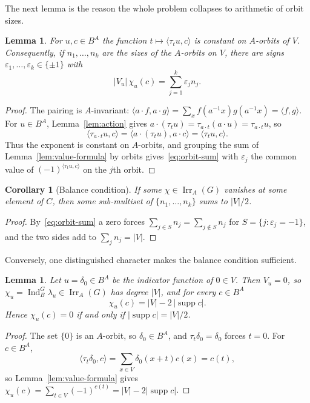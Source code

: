 \documentclass[11pt,a4paper,reqno]{amsart}
\newtheorem{lemma}[theorem]{Lemma}
\newtheorem{corollary}[theorem]{Corollary}
\theoremstyle{definition}
\theoremstyle{remark}
\newcommand{\Irr}{\operatorname{Irr}}
\newcommand{\Ind}{\operatorname{Ind}}
\newcommand{\supp}{\operatorname{supp}}
\begin{document}
The next lemma is the reason the whole problem collapses to arithmetic
of orbit sizes.

\begin{lemma}\label{lem:orbit-constant}
For $u,c\in B^A$ the function $t\mapsto\langle\tau_tu,c\rangle$ is
constant on $A$-orbits of $V$.  Consequently, if $n_1,\dots,n_k$ are
the sizes of the $A$-orbits on $V$, there are signs
$\varepsilon_1,\dots,\varepsilon_k\in\{\pm1\}$ with
\begin{equation}\label{eq:orbit-sum}
 |V_u|\,\chi_u(c)=\sum_{j=1}^k\varepsilon_jn_j .
\end{equation}
\end{lemma}

\begin{proof}
The pairing is $A$-invariant: $\langle a\cdot f,a\cdot g\rangle
=\sum_xf(a^{-1}x)g(a^{-1}x)=\langle f,g\rangle$.  For $u\in B^A$,
Lemma~\ref{lem:action} gives
$a\cdot(\tau_tu)=\tau_{a\cdot t}(a\cdot u)=\tau_{a\cdot t}u$, so
\[
 \langle\tau_{a\cdot t}u,c\rangle
 =\langle a\cdot(\tau_tu),a\cdot c\rangle
 =\langle\tau_tu,c\rangle .
\]
Thus the exponent is constant on $A$-orbits, and grouping the sum of
Lemma~\ref{lem:value-formula} by orbits gives~\eqref{eq:orbit-sum}
with $\varepsilon_j$ the common value of
$(-1)^{\langle\tau_tu,c\rangle}$ on the $j$th orbit.
\end{proof}

\begin{corollary}[Balance condition]\label{cor:balance}
If some $\chi\in\Irr_A(G)$ vanishes at some element of $C$, then some
sub-multiset of $\{n_1,\dots,n_k\}$ sums to $|V|/2$.
\end{corollary}

\begin{proof}
By~\eqref{eq:orbit-sum} a zero forces
$\sum_{j\in S}n_j=\sum_{j\notin S}n_j$ for $S=\{j:\varepsilon_j=-1\}$,
and the two sides add to $\sum_jn_j=|V|$.
\end{proof}

Conversely, one distinguished character makes the balance condition
sufficient.

\begin{lemma}\label{lem:delta-values}
Let $u=\delta_0\in B^A$ be the indicator function of $0\in V$.  Then
$V_u=0$, so $\chi_u=\Ind_B^G\lambda_u\in\Irr_A(G)$ has degree $|V|$,
and for every $c\in B^A$
\[
 \chi_u(c)=|V|-2\,|\supp c| .
\]
Hence $\chi_u(c)=0$ if and only if $|\supp c|=|V|/2$.
\end{lemma}

\begin{proof}
The set $\{0\}$ is an $A$-orbit, so $\delta_0\in B^A$, and
$\tau_t\delta_0=\delta_0$ forces $t=0$.  For $c\in B^A$,
\[
 \langle\tau_t\delta_0,c\rangle=\sum_{x\in V}\delta_0(x+t)c(x)=c(t),
\]
so Lemma~\ref{lem:value-formula} gives
$\chi_u(c)=\sum_{t\in V}(-1)^{c(t)}=|V|-2|\supp c|$.
\end{proof}
\end{document}
